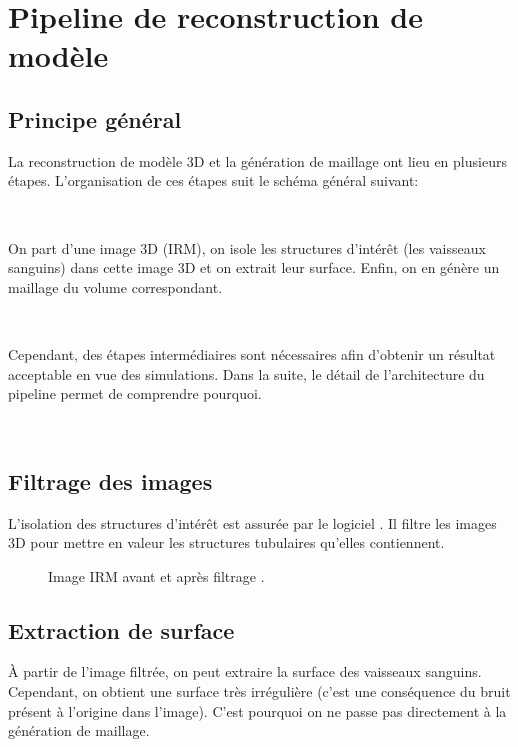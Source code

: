 
\section{Pipeline de reconstruction de modèle}

\subsection{Principe général}

La reconstruction de modèle 3D et la génération de maillage ont lieu en plusieurs étapes. L'organisation de ces étapes suit le schéma général suivant:

\ 

On part d'une image 3D (IRM), on isole les structures d'intérêt (les vaisseaux sanguins) dans cette image 3D et on extrait leur surface. Enfin, on en génère un maillage du volume correspondant.

\ 

Cependant, des étapes intermédiaires sont nécessaires afin d'obtenir un résultat acceptable en vue des simulations. Dans la suite, le détail de l'architecture du pipeline permet de comprendre pourquoi.

\ 

\subsection{Filtrage des images}

L'isolation des structures d'intérêt est assurée par le logiciel \rorpo. Il filtre les images 3D pour mettre en valeur les structures tubulaires qu'elles contiennent.

\begin{figure}[H]
\begin{center}
\caption{Image IRM avant  et après filtrage .
}
\end{center}
\label{fig:rorpo}
\end{figure}

\subsection{Extraction de surface}

À partir de l'image filtrée, on peut extraire la surface des vaisseaux sanguins. Cependant, on obtient une surface très irrégulière (c'est une conséquence du bruit présent à l'origine dans l'image). C'est pourquoi on ne passe pas directement à la génération de maillage.

